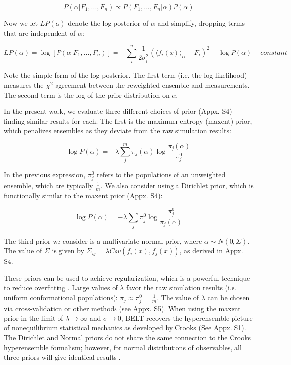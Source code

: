 \documentclass[11pt,titlepage]{article}
\begin{document}
$$P(\alpha | F_1, ..., F_n) \propto P(F_1, ..., F_n | \alpha) P(\alpha)$$

Now we let $LP(\alpha)$ denote the log posterior of $\alpha$ and simplify, dropping terms that are independent of $\alpha$:

$$LP(\alpha) = \log[ P(\alpha|F_1, ..., F_n)] = -\sum_i^n \frac{1}{2\sigma_i^2}(\langle f_i(x)\rangle _\alpha - F_i)^2 + \log P(\alpha) + constant$$

Note the simple form of the log posterior.  The first term (i.e. the log likelihood) measures the $\chi^2$ agreement between the reweighted ensemble and measurements.  The second term is the log of the prior distribution on $\alpha$.  

In the present work, we evaluate three different choices of prior (Appx. S4), finding similar results for each.  The first is the maximum entropy (maxent) prior, which penalizes ensembles as they deviate from the raw simulation results:

$$\log P(\alpha) = -\lambda \sum_j^m \pi_j(\alpha) \log \frac{\pi_j(\alpha)}{\pi_j^0}$$

In the previous expression, $\pi_j^0$ refers to the populations of an unweighted ensemble, which are typically $\frac{1}{m}$.  We also consider using a Dirichlet prior, which is functionally similar to the maxent prior (Appx. S4):

$$\log P(\alpha) = -\lambda \sum_j \pi_j^0 \log \frac{\pi_j^0}{\pi_j(\alpha)}$$

The third prior we consider is a multivariate normal prior, where  $\alpha \sim N(0, \Sigma)$.  The value of $\Sigma$ is given by $\Sigma_{ij} = \lambda Cov(f_i(x), f_j(x))$, as derived in Appx. S4.

These priors can be used to achieve regularization, which is a powerful technique to reduce overfitting \cite{friedman2001elements}.  Large values of $\lambda$ favor the raw simulation results (i.e. uniform conformational populations): $\pi_j \approx \pi_j^0 = \frac{1}{m}$.  The value of $\lambda$ can be chosen via cross-validation or other methods (see Appx. S5).  When using the maxent prior in the limit of $\lambda \rightarrow \infty$ and $\sigma \rightarrow 0$, BELT recovers the hyperensemble picture of nonequilibrium statistical mechanics as developed \citep{crooks2007beyond} by Crooks (See Appx. S1).  The Dirichlet and Normal priors do not share the same connection to the Crooks hyperensemble formalism; however, for normal distributions of observables, all three priors will give identical results \citep{relative_entropy_wiki}.  
\end{document}

